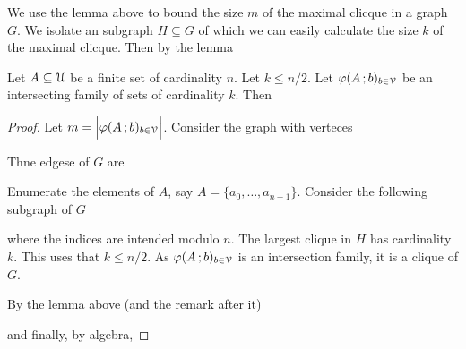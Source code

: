 \documentclass[scombinatorics.tex]{subfiles}
\begin{document}
We use the lemma above to bound the size $m$ of the maximal clicque in a graph $G$.
We isolate an subgraph $H\subseteq G$ of which we can easily calculate the size $k$ of the maximal clicque.
Then by the lemma 


\begin{void_thm}
   Let $A\subseteq\EuScript U$ be a finite set of cardinality $n$. 
   Let $k\le n/2$.
   Let $\varphi(A\,;b)_{b\in\EuScript V}$ be an intersecting family of sets of cardinality $k$.
   Then 
   
\end{void_thm}
   
\begin{proof}
   Let $m=\Big|\varphi(A\,;b)_{b\in\EuScript V}\Big|$.
   Consider the graph with verteces
   

   Thne edgese of $G$ are   


   Enumerate the elements of $A$, say $A=\{a_0,\dots,a_{n-1}\}$.
   Consider the following subgraph of $G$ 
   

   where the indices are intended modulo $n$.
   The largest clique in $H$ has cardinality $k$.
   This uses that $k\le n/2$.
   As $\varphi(A\,;b)_{b\in\EuScript V}$ is an intersection family, it is a clique of $G$.
   
   By the lemma above (and the remark after it)


   and finally, by algebra,
  
\end{proof}
\end{document}
